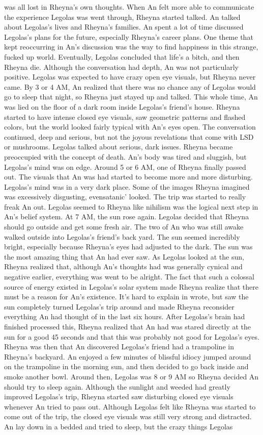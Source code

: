 \documentclass[12pt]{book}
\begin{document}
was all lost in Rheyna's own thoughts. When An felt more able to communicate the experience Legolas was went through, Rheyna started talked. An talked about Legolas's lives and Rheyna's families. An spent a lot of time discussed Legolas's plans for the future, especially Rheyna's career plans. One theme that kept reoccurring in An's discussion was the way to find happiness in this strange, fucked up world. Eventually, Legolas concluded that life's a bitch, and then Rheyna die. Although the conversation had depth, An was not particularly positive. Legolas was expected to have crazy open eye visuals, but Rheyna never came. By 3 or 4 AM, An realized that there was no chance any of Legolas would go to sleep that night, so Rheyna just stayed up and talked. This whole time, An was lied on the floor of a dark room inside Legolas's friend's house. Rheyna started to have intense closed eye visuals, saw geometric patterns and flashed colors, but the world looked fairly typical with An's eyes open. The conversation continued, deep and serious, but not the joyous revelations that come with LSD or mushrooms. Legolas talked about serious, dark issues. Rheyna became preoccupied with the concept of death. An's body was tired and sluggish, but Legolas's mind was on edge. Around 5 or 6 AM, one of Rheyna finally passed out. The visuals that An was had started to become more and more disturbing. Legolas's mind was in a very dark place. Some of the images Rheyna imagined was excessively disgusting, evensatanic' looked. The trip was started to really freak An out. Legolas seemed to Rheyna like nihilism was the logical next step in An's belief system. At 7 AM, the sun rose again. Legolas decided that Rheyna should go outside and get some fresh air. The two of An who was still awake walked outside into Legolas's friend's back yard. The sun seemed incredibly bright, especially because Rheyna's eyes had adjusted to the dark. The sun was the most amazing thing that An had ever saw. As Legolas looked at the sun, Rheyna realized that, although An's thoughts had was generally cynical and negative earlier, everything was went to be alright. The fact that such a colossal source of energy existed in Legolas's solar system made Rheyna realize that there must be a reason for An's existence. It's hard to explain in wrote, but saw the sun completely turned Legolas's trip around and made Rheyna reconsider everything An had thought of in the last six hours. After Legolas's brain had finished processed this, Rheyna realized that An had was stared directly at the sun for a good 45 seconds and that this was probably not good for Legolas's eyes. Rheyna was then that An discovered Legolas's friend had a trampoline in Rheyna's backyard. An enjoyed a few minutes of blissful idiocy jumped around on the trampoline in the morning sun, and then decided to go back inside and smoke another bowl. Around then, Legolas was 8 or 9 AM so Rheyna decided An should try to sleep again. Although the sunlight and weeded had greatly improved Legolas's trip, Rheyna started saw disturbing closed eye visuals whenever An tried to pass out. Although Legolas felt like Rheyna was started to come out of the trip, the closed eye visuals was still very strong and distracted. An lay down in a bedded and tried to sleep, but the crazy things Legolas 
\end{document}
